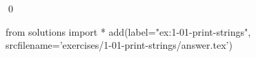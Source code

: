 
\begin{ex}
  \label{ex:1-01-print-strings}
  
  \qed
\end{ex}
\begin{python0}
from solutions import *
add(label="ex:1-01-print-strings",
    srcfilename='exercises/1-01-print-strings/answer.tex')
\end{python0}
